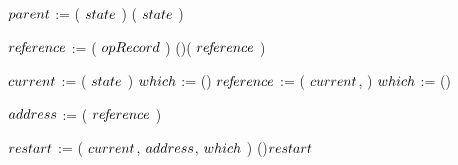 \begin{limitscope}
\begin{algorithm}[tbh]
{{	    \BlankLine
			
			{
			   \label{lin:local-seek|successor:while:clean:begin}
			   \If{\NeedCleanParentNode( $\opRecord$, $\cNode$ )}
		     {
				    
				    $\pNode$ := \GetSecondToTop( $state$ )\;
				    \If{\LNot(\IsClean( $\pNode$ ))}
				    {
				       \RemoveFromTop( $state$ )\;
					     \Continue\;
							 \label{lin:local-seek|successor:while:clean:end}
				    }
			   }
				
			}
			
			\BlankLine
			
	    $re\!f\!erence$ := \NeedSuccessorKey( $\opRecord$ )\;
			\label{lin:local-seek|successor:while:need|successor}
			\If(){\IsNull( $re\!f\!erence$ )}{ 
			   \Return \false\;
			}
					
			$\cNode$ := \GetTop( $state$ )\;
			{
			   \label{lin:local-seek|successor:while:traversal:if:begin}
			   $which$ := \RIGHT\;
				 \label{lin:local-seek|successor:while:traversal:if:end}
			}
			\Else()
			{
			   \label{lin:local-seek|successor:while:traversal:else:begin}
		 	   $re\!f\!erence$ := \GetChild( $\cNode$, \LEFT{} )\;
			   $which$ := \LEFT\;
				 \label{lin:local-seek|successor:while:traversal:else:end}
			}
			\BlankLine
			\Repeat(){\True}
	    {
			   \label{lin:local-seek|successor:while:traversal:begin}
				
				 $address$ := \GetAddress( $re\!f\!erence$ )\;	
				
				 $restart$ := \Move( $\cNode$, $address$, $which$ )\;
				 \label{lin:local-seek|successor:while:traversal:move}
			   \If(){$restart$}
			   {
				    \Break\;
						\label{lin:local-seek|successor:while:traversal:restart}
			   }  
				 
}}}
\end{algorithm}
\end{limitscope}
